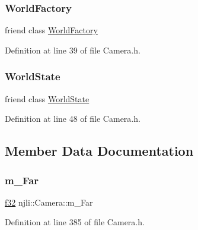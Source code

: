 \subsubsection{\texorpdfstring{World\+Factory}{WorldFactory}}
{\footnotesize\ttfamily friend class \mbox{\hyperlink{classnjli_1_1_world_factory}{World\+Factory}}\hspace{0.3cm}{\ttfamily [friend]}}



Definition at line 39 of file Camera.\+h.

\mbox{\label{classnjli_1_1_camera_a59cdb6fe5b378389e35b8b2a2f4e990e}} 
\subsubsection{\texorpdfstring{World\+State}{WorldState}}
{\footnotesize\ttfamily friend class \mbox{\hyperlink{classnjli_1_1_world_state}{World\+State}}\hspace{0.3cm}{\ttfamily [friend]}}



Definition at line 48 of file Camera.\+h.



\subsection{Member Data Documentation}
\mbox{\label{classnjli_1_1_camera_a34d45ec43ca2eec498138e80685d8ffc}} 
\subsubsection{\texorpdfstring{m\+\_\+\+Far}{m\_Far}}
{\footnotesize\ttfamily \mbox{\hyperlink{_util_8h_a5f6906312a689f27d70e9d086649d3fd}{f32}} njli\+::\+Camera\+::m\+\_\+\+Far\hspace{0.3cm}{\ttfamily [private]}}



Definition at line 385 of file Camera.\+h.

\mbox{\label{classnjli_1_1_camera_aab4d792e3aeaf5cf1072d0a75d4d4f58}} 
